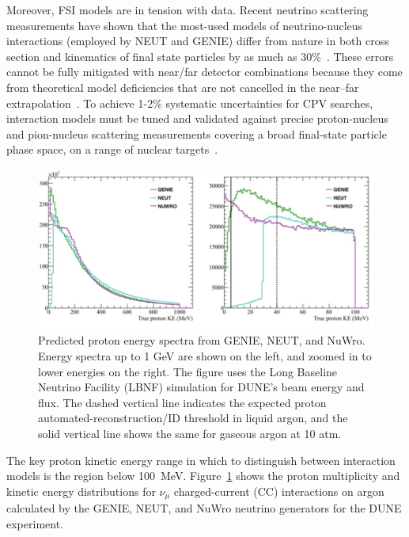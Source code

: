 Moreover, FSI models are in tension with data.  
Recent neutrino scattering measurements have shown that the most-used models of neutrino-nucleus interactions (employed by NEUT and GENIE) differ from nature in both cross section and kinematics of final state particles by as much as 30\%~\cite{Wascko:2009cn,Wascko:2011hy}. 
These errors cannot be fully mitigated with near/far detector combinations because they come from theoretical model deficiencies that are not cancelled in the near–far extrapolation~\cite{Coloma:2013rqa}. 
To achieve 1-2\% systematic uncertainties for CPV searches, interaction models must be tuned and validated against precise proton-nucleus and pion-nucleus scattering measurements covering a broad final-state particle phase space, on a range of nuclear targets~\cite{Cao:2014zra}.

\begin{figure}%
    \centering
    \includegraphics[width=12cm]{files/Figures/protons_from_argon.jpeg}%
    \caption{Predicted proton energy spectra from GENIE, NEUT, and NuWro\cite{Raaf:2018aaa}. Energy spectra up to 1 GeV are shown on the left, and zoomed in to lower energies on the right. The figure uses the Long Baseline Neutrino Facility (LBNF) simulation for DUNE's beam energy and flux. The dashed vertical line indicates the expected proton automated-reconstruction/ID threshold in liquid argon, and the solid vertical line shows the same for gaseous argon at 10 atm.}
    \label{fig:protonsfromargon}%
\end{figure}
The key proton kinetic energy range in which to distinguish between interaction models is the region below 100~MeV.
Figure~\ref{fig:protonsfromargon} shows the proton multiplicity and kinetic energy distributions for $\nu_{\mu}$ charged-current (CC) interactions on argon calculated by the GENIE, NEUT, and NuWro neutrino generators for the DUNE experiment.
